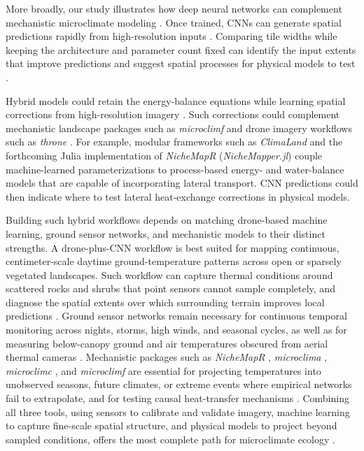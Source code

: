 \documentclass[12pt]{article}
\begin{document}
\noindent More broadly, our study illustrates how deep neural networks can complement mechanistic microclimate modeling \citep{reichstein_2019, wesselkamp_2024}. Once trained, CNNs can generate spatial predictions rapidly from high-resolution inputs \citep{slater_2023, campsvalls_2025}. Comparing tile widths while keeping the architecture and parameter count fixed can identify the input extents that improve predictions and suggest spatial processes for physical models to test \citep{reichstein_2019, oloughlin_2025}.

Hybrid models could retain the energy-balance equations while learning spatial corrections from high-resolution imagery \citep{wesselkamp_2024, levy_2024, deck_2026, Itzkovitch2025}. Such corrections could complement mechanistic landscape packages such as \textit{microclimf} \citep{maclean_2026} and drone imagery workflows such as \textit{throne} \citep{Alujevic2025}. For example, modular frameworks such as \textit{ClimaLand} \citep{deck_2026} and the forthcoming Julia implementation of \textit{NicheMapR} (\textit{NicheMapper.jl}) couple machine-learned parameterizations to process-based energy- and water-balance models that are capable of incorporating lateral transport. CNN predictions could then indicate where to test lateral heat-exchange corrections in physical models.

Building such hybrid workflows depends on matching drone-based machine learning, ground sensor networks, and mechanistic models to their distinct strengths. A drone-plus-CNN workflow is best suited for mapping continuous, centimeter-scale daytime ground-temperature patterns across open or sparsely vegetated landscapes. Such workflow can capture thermal conditions around scattered rocks and shrubs that point sensors cannot sample completely, and diagnose the spatial extents over which surrounding terrain improves local predictions \citep{zellweger_2019, duffy_2021, levy_2024, Alujevic2025, Itzkovitch2025}. Ground sensor networks remain necessary for continuous temporal monitoring across nights, storms, high winds, and seasonal cycles, as well as for measuring below-canopy ground and air temperatures obscured from aerial thermal cameras \citep{maclean_2021_meas, gril_2023, de_frenne_2025}. Mechanistic packages such as \textit{NicheMapR} \citep{kearney_2017, kearney_2020}, \textit{microclima} \citep{maclean_2019}, \textit{microclimc} \citep{maclean_2021_microclimc}, and \textit{microclimf} \citep{maclean_2026} are essential for projecting temperatures into unobserved seasons, future climates, or extreme events where empirical networks fail to extrapolate, and for testing causal heat-transfer mechanisms \citep{briscoe_2023}. Combining all three tools, using sensors to calibrate and validate imagery, machine learning to capture fine-scale spatial structure, and physical models to project beyond sampled conditions, offers the most complete path for microclimate ecology \citep{slater_2023, levy_2024, wesselkamp_2024}.
\end{document}
